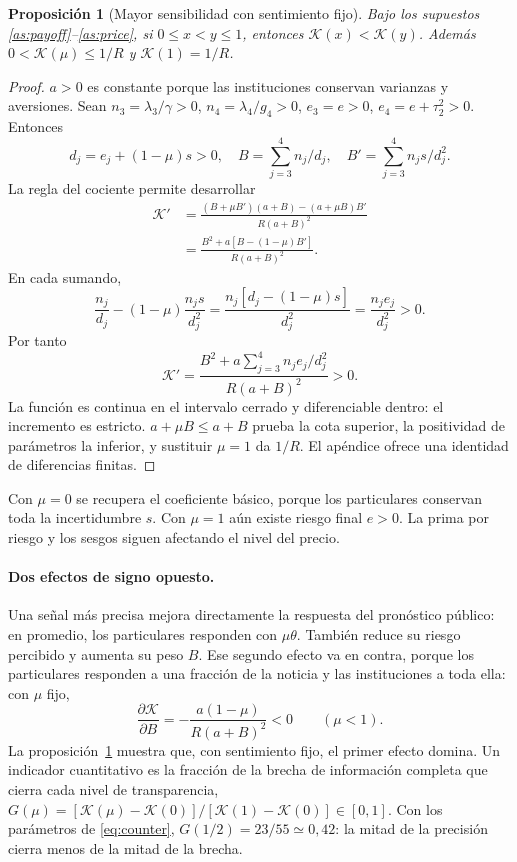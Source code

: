 \documentclass[11pt]{article}
\newcommand{\K}{\mathcal K}
\newtheorem{proposition}{Proposición}
\begin{document}
\begin{proposition}[Mayor sensibilidad con sentimiento fijo]\label{prop:main}
Bajo los supuestos \ref{as:payoff}--\ref{as:price}, si
$0\leq x<y\leq1$, entonces $\K(x)<\K(y)$.
Además $0<\K(\mu)\leq1/R$ y $\K(1)=1/R$.
\end{proposition}
\begin{proof}
$a>0$ es constante porque las instituciones conservan varianzas y aversiones.
Sean $n_3=\lambda_3/\gamma>0$, $n_4=\lambda_4/g_4>0$,
$e_3=e>0$, $e_4=e+\tau_2^2>0$. Entonces
\begin{equation}
 d_j=e_j+(1-\mu)s>0,\quad
 B=\sum_{j=3}^4 n_j/d_j,\quad
 B'=\sum_{j=3}^4 n_js/d_j^2.
\end{equation}
La regla del cociente permite desarrollar
\begin{align}
 \K'&=\frac{(B+\mu B')(a+B)-(a+\mu B)B'}{R(a+B)^2}\\
 &=\frac{B^2+a[B-(1-\mu)B']}{R(a+B)^2}.
\end{align}
En cada sumando,
\begin{equation}
 \frac{n_j}{d_j}-(1-\mu)\frac{n_js}{d_j^2}
 =\frac{n_j[d_j-(1-\mu)s]}{d_j^2}
 =\frac{n_je_j}{d_j^2}>0.
\end{equation}
Por tanto
\begin{equation}\label{eq:derivative}
 \boxed{\K'=\frac{B^2+a\sum_{j=3}^4 n_je_j/d_j^2}{R(a+B)^2}>0.}
\end{equation}
La función es continua en el intervalo cerrado y diferenciable dentro:
el incremento es estricto. $a+\mu B\leq a+B$ prueba la cota superior,
la positividad de parámetros la inferior, y sustituir $\mu=1$ da $1/R$.
El apéndice ofrece una identidad de diferencias finitas.
\end{proof}
Con $\mu=0$ se recupera el coeficiente básico, porque los particulares
conservan toda la incertidumbre $s$. Con $\mu=1$ aún existe riesgo final
$e>0$. La prima por riesgo y los sesgos siguen afectando el nivel del precio.

\paragraph{Dos efectos de signo opuesto.} Una señal más precisa mejora
directamente la respuesta del pronóstico público: en promedio, los
particulares responden con $\mu\theta$. También reduce su riesgo percibido
y aumenta su peso $B$. Ese segundo efecto va en contra, porque los
particulares responden a una fracción de la noticia y las instituciones a
toda ella: con $\mu$ fijo,
\begin{equation}\label{eq:weight}
 \frac{\partial\K}{\partial B}=-\frac{a(1-\mu)}{R(a+B)^2}<0
 \qquad(\mu<1).
\end{equation}
La proposición~\ref{prop:main} muestra que, con sentimiento fijo, el
primer efecto domina. Un indicador cuantitativo es la fracción de la
brecha de información completa que cierra cada nivel de transparencia,
$G(\mu)=[\K(\mu)-\K(0)]/[\K(1)-\K(0)]\in[0,1]$. Con los parámetros de
\eqref{eq:counter}, $G(1/2)=23/55\simeq0{,}42$: la mitad de la precisión
cierra menos de la mitad de la brecha.
\end{document}
